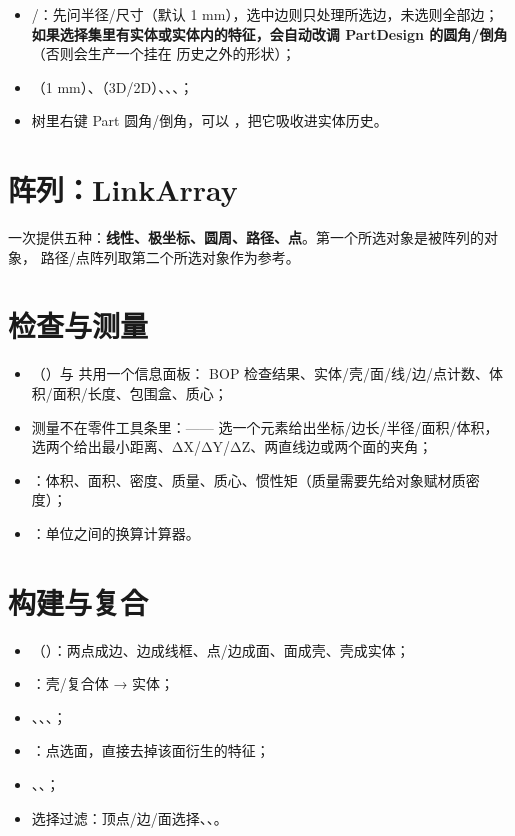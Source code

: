 \begin{itemize}
  \item {}/：先问半径/尺寸（默认 1 mm），选中边则只处理所选边，未选则全部边；
        \textbf{如果选择集里有实体或实体内的特征，会自动改调 PartDesign 的圆角/倒角}（否则会生产一个挂在
        历史之外的形状）；
  \item {}（1 mm）、（3D/2D）、、、；
  \item 树里右键 Part 圆角/倒角，可以 ，把它吸收进实体历史。
\end{itemize}

\section{阵列：LinkArray}

 一次提供五种：\textbf{线性、极坐标、圆周、路径、点}。第一个所选对象是被阵列的对象，
路径/点阵列取第二个所选对象作为参考。

\section{检查与测量}

\begin{itemize}
  \item {}（）与  共用一个信息面板：
        BOP 检查结果、实体/壳/面/线/边/点计数、体积/面积/长度、包围盒、质心；
  \item 测量不在零件工具条里：——
        选一个元素给出坐标/边长/半径/面积/体积，选两个给出最小距离、ΔX/ΔY/ΔZ、两直线边或两个面的夹角；
  \item {}：体积、面积、密度、质量、质心、惯性矩（质量需要先给对象赋材质密度）；
  \item {}：单位之间的换算计算器。
\end{itemize}

\section{构建与复合}

\begin{itemize}
  \item {}（）：两点成边、边成线框、点/边成面、面成壳、壳成实体；
  \item {}：壳/复合体 → 实体；
  \item {}、、、；
  \item {}：点选面，直接去掉该面衍生的特征；
  \item {}、、；
  \item 选择过滤：顶点/边/面选择、、。
\end{itemize}


